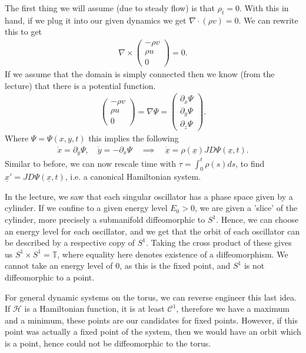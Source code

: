 \begin{solution}[8.2]
The first thing we will assume (due to steady flow) is that $\rho_t=0$. With this in hand, if we plug it into our given dynamics we get $\nabla \cdot (\rho v)=0$. We can rewrite this to get
\begin{align}
	\nabla \times
	\begin{pmatrix}
		-\rho v \\ \rho u \\ 0
	\end{pmatrix}
=0.	
\end{align}
If we assume that the domain is simply connected then we know (from the lecture) that there is a potential function.
\begin{align}
	\begin{pmatrix}
		-\rho v \\ \rho u \\ 0
	\end{pmatrix}
	= \nabla \Psi = 
	\begin{pmatrix}
	\partial_x \Psi \\ \partial_y \Psi \\ \partial_z \Psi	
	\end{pmatrix}
.	
\end{align}
Where $\Psi = \Psi(x,y,t)$ this implies the following
 \begin{align}
	 \dot{x} = \partial_y \Psi, \quad \dot{y} =-\partial_x \Psi \quad \implies \quad \dot{\underline{x}}= \rho(\underline{x}) JD\Psi(\underline{x},t).
\end{align}
Similar to before, we can now rescale time with $\tau = \int_{0}^{t} \rho(s)ds$, to find $\underline{x}' = JD\Psi(\underline{x}, t)$, i.e. a canonical Hamiltonian system.
\end{solution}

\begin{solution}[8.3]
In the lecture, we saw that each singular oscillator has a phase space given by a cylinder. If we confine to a given energy level $E_0>0$, we are given a 'slice' of the cylinder, more precisely a submanifold diffeomorphic to  $S^1$. Hence, we can choose an energy level for each oscillator, and we get that the orbit of each oscillator can be described by a respective copy of $S^1$. Taking the cross product of these gives us $S^1 \times S^1 = \mathbb{T}$, where equality here denotes existence of a diffeomorphism. We cannot take an energy level of 0, as this is the fixed point, and $S^1$ is not diffeomorphic to a point.

For general dynamic systems on the torus, we can reverse engineer this last idea. If $ \mathcal{H}$ is a Hamiltonian function, it is at least  $\mathcal{C}^1$, therefore we have a maximum and a minimum, these points are our candidates for fixed points. However, if this point was actually a fixed point of the system, then we would have an orbit which is a point, hence could not be diffeomorphic to the torus.
\end{solution}


